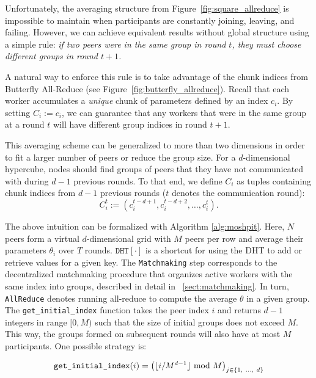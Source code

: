 Unfortunately, the averaging structure from Figure~\ref{fig:square_allreduce} is impossible to maintain when participants are constantly joining, leaving, and failing. However, we can achieve equivalent results without global structure using a simple rule: \textit{if two peers were in the same group in round $t$, they must choose different groups in round $t {+} 1$.}

A natural way to enforce this rule is to take advantage of the chunk indices from Butterfly All-Reduce (see Figure~\ref{fig:butterfly_allreduce}). Recall that each worker accumulates a \textit{unique} chunk of parameters defined by an index $c_i$. By setting $C_i := c_i$, we can guarantee that any workers that were in the same group at a round $t$ will have different group indices in round $t {+} 1$.

This averaging scheme can be generalized to more than two dimensions in order to fit a larger number of peers or reduce the group size. For a $d$-dimensional hypercube, nodes should find groups of peers that they have not communicated with during $d {-} 1$ previous rounds. To that end, we define $C_i$ as tuples containing chunk indices from $d{-}1$ previous rounds ($t$ denotes the communication round):
\vspace{-2pt}
\begin{equation}
    C^t_i := (c^{t-d+1}_i, c^{t-d+2}_i, \ldots, c^{t }_i).
    \label{eq:group}
\end{equation}

The above intuition can be formalized with Algorithm \ref{alg:moshpit}.
Here, $N$ peers form a virtual $d$-dimensional grid with $M$ peers per row and average their parameters $\theta_i$ over $T$ rounds. $\texttt{DHT}[\cdot]$ is a shortcut for using the DHT to add or retrieve values for a given key. The  \texttt{Matchmaking} step corresponds to the decentralized matchmaking procedure that organizes active workers with the same index into groups, described in detail in ~\autoref{sect:matchmaking}. In turn, \texttt{AllReduce} denotes running all-reduce to compute the average $\theta$ in a given group. The \texttt{get\_initial\_index} function takes the peer index $i$ and returns $d{-}1$ integers
in range $[0, M)$ such that the size of initial groups does not exceed $M$.
This way, the groups formed on subsequent rounds will also have at most $M$ participants. One possible strategy is:

\vspace{-8pt}
\begin{equation}
    \texttt{get\_initial\_index}(i) = 
    \begin{pmatrix}
           \lfloor i / M^{d{-}1} \rfloor \ \mathrm{mod}\ M \\
         \end{pmatrix}_{j\in \{1,\ \ldots,\ d\}}
    \label{eq:get_initial_index}
\end{equation}

